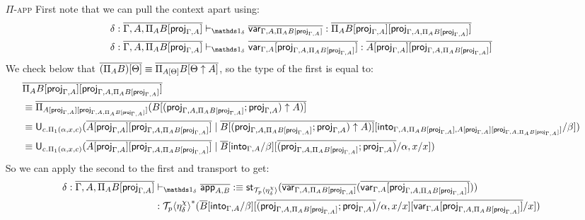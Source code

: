 \documentclass[10pt]{article}
\theoremstyle{definition}
\newcommand{\yields}{\vdash}
\newcommand\U[3]{\ensuremath{\mathsf{U}_{#1}(#2 \mid #3)}}
\newcommand\St[2]{\ensuremath{{#1}^*(#2)}}
\newcommand\StI[2]{\ensuremath{\mathsf{st}_{#1}(#2)}}
\newcommand\ApEl[2]{\mathcal{T}_{#1}\langle#2\rangle}
\begin{document}
\begin{enumerate}
\item[\textsc{$\Pi$-app}] First note that we can pull the context apart using:
\begin{align*}
\delta : \upstairs{\Gamma, A, \Pi_A B[\proj{\Gamma, A}]} &\yields_{\One_\delta} \upstairs{\qvar{\Gamma, A, \Pi_A B[\proj{\Gamma, A}]}} : \upstairs{\Pi_A B[\proj{\Gamma, A}][\proj{\Gamma, A, \Pi_A B[\proj{\Gamma, A}]}]} \\ 
\delta : \upstairs{\Gamma, A, \Pi_A B[\proj{\Gamma, A}]} &\yields_{\One_\delta} \upstairs{\qvar{\Gamma, A}[\proj{\Gamma, A, \Pi_A B[\proj{\Gamma, A}]}]} : \upstairs{A[\proj{\Gamma, A}][\proj{\Gamma, A, \Pi_A B[\proj{\Gamma, A}]}]} 
\end{align*}
We check below that $\overline{(\Pi_A B)[\Theta]} \equiv \overline{\Pi_{A[\Theta]} B[\Theta \uparrow A]}$, so the type of the first is equal to:
\begin{align*}
&\upstairs{\Pi_A B[\proj{\Gamma, A}][\proj{\Gamma, A, \Pi_A B[\proj{\Gamma, A}]}]} \\
&\equiv \upstairs{\Pi_{A[\proj{\Gamma, A}][\proj{\Gamma, A, \Pi_A B[\proj{\Gamma, A}]}]} (B[(\proj{\Gamma, A, \Pi_A B[\proj{\Gamma, A}]};\proj{\Gamma, A}) \uparrow A)]} \\
&\equiv \U{c. \Pi_1(\alpha,x,c)}{\upstairs{A[\proj{\Gamma, A}][\proj{\Gamma, A, \Pi_A B[\proj{\Gamma, A}]}]}}{\upstairs{B[(\proj{\Gamma, A, \Pi_A B[\proj{\Gamma, A}]};\proj{\Gamma, A}) \uparrow A)]}[\into{\Gamma, A, \Pi_A B[\proj{\Gamma, A}], A[\proj{\Gamma, A}][\proj{\Gamma, A, \Pi_A B[\proj{\Gamma, A}]}]}/\beta]} \\
&\equiv \U{c. \Pi_1(\alpha,x,c)}{\upstairs{A[\proj{\Gamma, A}][\proj{\Gamma, A, \Pi_A B[\proj{\Gamma, A}]}]}}{\upstairs{B}[\into{\Gamma, A}/\beta][\upstairs{(\proj{\Gamma, A, \Pi_A B[\proj{\Gamma, A}]};\proj{\Gamma, A})}/\alpha, x/x]}
\end{align*}
So we can apply the second to the first and transport to get:
\begin{align*}
\delta : \upstairs{\Gamma, A, \Pi_A B[\proj{\Gamma, A}]} &\yields_{\One_\delta} \upstairs{\qapp{A,B}} :\equiv \StI{\ApEl{p}{\eta^\chi_\delta}}{\upstairs{\qvar{\Gamma, A, \Pi_A B[\proj{\Gamma, A}]}}(\upstairs{\qvar{\Gamma, A}[\proj{\Gamma, A, \Pi_A B[\proj{\Gamma, A}]}]})} \\&: \St{\ApEl{p}{\eta^\chi_\delta}}{\upstairs{B}[\into{\Gamma, A}/\beta][\upstairs{(\proj{\Gamma, A, \Pi_A B[\proj{\Gamma, A}]};\proj{\Gamma, A})}/\alpha, x/x][\upstairs{\qvar{\Gamma, A}[\proj{\Gamma, A, \Pi_A B[\proj{\Gamma, A}]}]}/x]}
\end{align*}

\end{enumerate}
\end{document}
